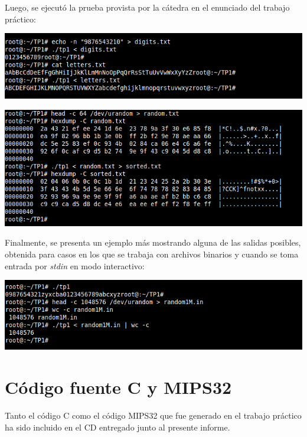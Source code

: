 \documentclass[a4paper,10pt]{article}
\begin{document}
Luego, se ejecut\'o la prueba provista por la c\'atedra en el enunciado del trabajo pr\'actico:
\begin{center}
\includegraphics[scale=0.60]{2.png}
\end{center}

\begin{center}
\includegraphics[scale=0.60]{3.png}
\end{center}
\pagebreak

Finalmente, se presenta un ejemplo m\'as mostrando alguna de las salidas posibles, obtenida para casos en los que se trabaja con archivos binarios y cuando se toma entrada por \textit{stdin} en modo interactivo:\\
\begin{center}
\includegraphics[scale=0.60]{4.png}
\end{center}
\pagebreak

\section{C\'odigo fuente C y MIPS32} 

Tanto el c\'odigo C como el c\'odigo MIPS32 que fue generado en el trabajo pr\'actico ha sido incluido en el CD entregado junto al presente informe.

\pagebreak
\end{document}
